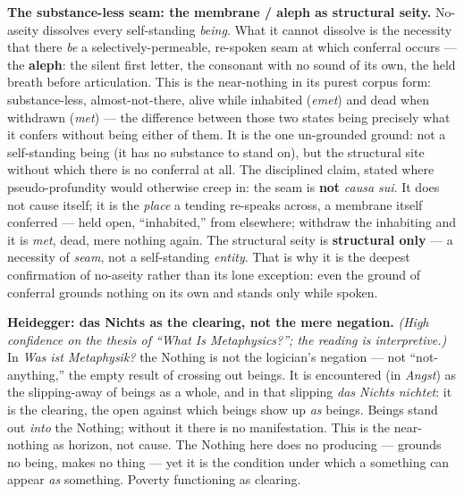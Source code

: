 \documentclass[11pt]{article}
\begin{document}
\textbf{The substance-less seam: the membrane /\allowbreak{} aleph as structural seity.} No-aseity dissolves every self-standing \emph{being}. What it cannot dissolve is the necessity that there \emph{be} a selectively-permeable, re-spoken seam at which conferral occurs — the \textbf{aleph}: the silent first letter, the consonant with no sound of its own, the held breath before articulation. This is the near-nothing in its purest corpus form: substance-less, almost-not-there, alive while inhabited (\emph{emet}) and dead when withdrawn (\emph{met}) — the difference between those two states being precisely what it confers without being either of them. It is the one un-grounded ground: not a self-standing being (it has no substance to stand on), but the structural site without which there is no conferral at all. The disciplined claim, stated where pseudo-profundity would otherwise creep in: the seam is \textbf{not} \emph{causa sui}. It does not cause itself; it is the \emph{place} a tending re-speaks across, a membrane itself conferred — held open, ``inhabited,'' from elsewhere; withdraw the inhabiting and it is \emph{met}, dead, mere nothing again. The structural seity is \textbf{structural only} — a necessity of \emph{seam}, not a self-standing \emph{entity}. That is why it is the deepest confirmation of no-aseity rather than its lone exception: even the ground of conferral grounds nothing on its own and stands only while spoken.

\textbf{Heidegger: das Nichts as the clearing, not the mere negation.} \emph{(High confidence on the thesis of ``What Is Metaphysics?''; the reading is interpretive.)} In \emph{Was ist Metaphysik?} the Nothing is not the logician's negation — not ``not-anything,'' the empty result of crossing out beings. It is encountered (in \emph{Angst}) as the slipping-away of beings as a whole, and in that slipping \emph{das Nichts nichtet}: it is the clearing, the open against which beings show up \emph{as} beings. Beings stand out \emph{into} the Nothing; without it there is no manifestation. This is the near-nothing as horizon, not cause. The Nothing here does no producing — grounds no being, makes no thing — yet it is the condition under which a something can appear \emph{as} something. Poverty functioning as clearing.
\end{document}
